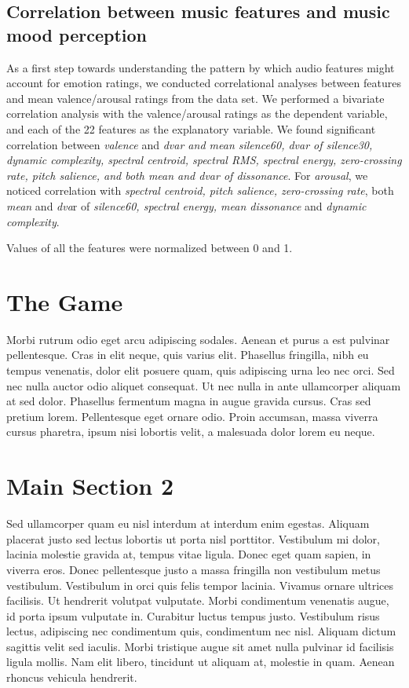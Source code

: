 \subsection{Correlation between music features and music mood perception}

As a first step towards understanding the pattern by which audio features might account for emotion ratings, we conducted correlational analyses between features and mean valence/arousal ratings from the data set. We performed a bivariate correlation analysis with the valence/arousal ratings as the dependent variable, and each of the 22 features as the explanatory variable. We found significant correlation between \textit{valence} and \textit{dvar and mean silence60, dvar of silence30, dynamic complexity, spectral centroid, spectral RMS, spectral energy, zero-crossing rate, pitch salience, and both mean and dvar of dissonance}. For \textit{arousal}, we noticed correlation with \textit{spectral centroid, pitch salience, zero-crossing rate}, both \textit{mean} and \textit{dva}r of  \textit{silence60, spectral energy, mean dissonance} and \textit{dynamic complexity}.

Values of all the features were normalized between 0 and 1. 




\section{The Game}
Morbi rutrum odio eget arcu adipiscing sodales. Aenean et purus a est pulvinar pellentesque. Cras in elit neque, quis varius elit. Phasellus fringilla, nibh eu tempus venenatis, dolor elit posuere quam, quis adipiscing urna leo nec orci. Sed nec nulla auctor odio aliquet consequat. Ut nec nulla in ante ullamcorper aliquam at sed dolor. Phasellus fermentum magna in augue gravida cursus. Cras sed pretium lorem. Pellentesque eget ornare odio. Proin accumsan, massa viverra cursus pharetra, ipsum nisi lobortis velit, a malesuada dolor lorem eu neque.



\section{Main Section 2}

Sed ullamcorper quam eu nisl interdum at interdum enim egestas. Aliquam placerat justo sed lectus lobortis ut porta nisl porttitor. Vestibulum mi dolor, lacinia molestie gravida at, tempus vitae ligula. Donec eget quam sapien, in viverra eros. Donec pellentesque justo a massa fringilla non vestibulum metus vestibulum. Vestibulum in orci quis felis tempor lacinia. Vivamus ornare ultrices facilisis. Ut hendrerit volutpat vulputate. Morbi condimentum venenatis augue, id porta ipsum vulputate in. Curabitur luctus tempus justo. Vestibulum risus lectus, adipiscing nec condimentum quis, condimentum nec nisl. Aliquam dictum sagittis velit sed iaculis. Morbi tristique augue sit amet nulla pulvinar id facilisis ligula mollis. Nam elit libero, tincidunt ut aliquam at, molestie in quam. Aenean rhoncus vehicula hendrerit.